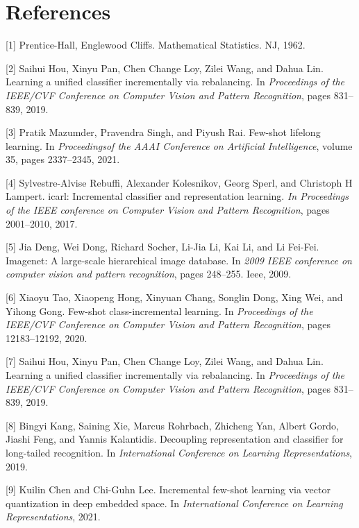 \documentclass{article}
\begin{document}
 

\section*{References}
[1] Prentice-Hall, Englewood Cliffs. Mathematical Statistics. NJ, 1962.

[2] Saihui Hou, Xinyu Pan, Chen Change Loy, Zilei Wang, and Dahua Lin. Learning a unified classifier incrementally via rebalancing. In \emph{Proceedings of the IEEE/CVF Conference on Computer Vision and Pattern Recognition}, pages 831–839, 2019.

[3] Pratik Mazumder, Pravendra Singh, and Piyush Rai. Few-shot lifelong learning. In \emph{Proceedingsof the AAAI Conference on Artificial Intelligence}, volume 35, pages 2337–2345, 2021.

[4] Sylvestre-Alvise Rebuffi, Alexander Kolesnikov, Georg Sperl, and Christoph H Lampert. icarl: Incremental classifier and representation learning. \emph{In Proceedings of the IEEE conference on Computer Vision and Pattern Recognition}, pages 2001–2010, 2017.

[5] Jia Deng, Wei Dong, Richard Socher, Li-Jia Li, Kai Li, and Li Fei-Fei. Imagenet:  A large-scale hierarchical image database. In \emph{2009 IEEE conference on computer vision and pattern recognition}, pages 248–255. Ieee, 2009.

[6] Xiaoyu Tao, Xiaopeng Hong, Xinyuan Chang, Songlin Dong, Xing Wei, and Yihong Gong. Few-shot class-incremental learning. In \emph{Proceedings of the IEEE/CVF Conference on Computer Vision and Pattern Recognition}, pages 12183–12192, 2020.

[7] Saihui Hou, Xinyu Pan, Chen Change Loy, Zilei Wang, and Dahua Lin.  Learning a unified classifier incrementally via rebalancing. In \emph{Proceedings of the IEEE/CVF Conference on Computer Vision and Pattern Recognition}, pages 831–839, 2019.

[8] Bingyi Kang, Saining Xie, Marcus Rohrbach, Zhicheng Yan, Albert Gordo, Jiashi Feng, and Yannis Kalantidis. Decoupling representation and classifier for long-tailed recognition.  In \emph{International Conference on Learning Representations}, 2019.

[9] Kuilin Chen and Chi-Guhn Lee. Incremental few-shot learning via vector quantization in deep embedded space. In \emph{International Conference on Learning Representations}, 2021. 
\end{document}
